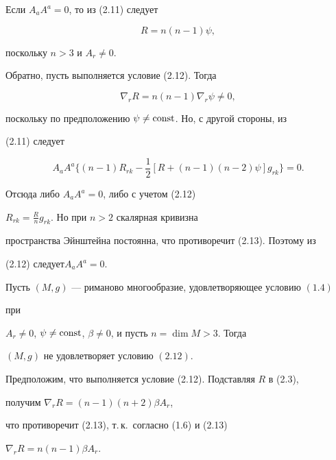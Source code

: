 \begin{pf} 


Если $A_a A^a=0$, то из (2.11) следует 


\begin{equation} 


R=n(n-1)\psi, 


\end{equation} 


поскольку $n>3$ и $A_r\ne 0$. 


 


Обратно, пусть выполняется условие (2.12). Тогда 


\begin{equation} 


\nabla_r R=n(n-1)\nabla_r\psi\ne 0, 


\end{equation} 


поскольку по предположению $\psi\ne\operatorname{const}$. Но, с другой стороны, из 


(2.11) следует 


$$ 


A_a A^a\{(n-1)R_{rk}-\frac{1}{2}[R+(n-1)(n-2)\psi]g_{rk}\}=0. 


$$ 


Отсюда либо $A_a A^a=0$, либо с учетом (2.12)\; 


$R_{rk}=\frac{R}{n}g_{rk}$. Но при $n>2$ скалярная кривизна 


пространства Эйнштейна постоянна, что противоречит (2.13). Поэтому из 


(2.12) следует\linebreak $A_a A^a=0$. 


\end{pf} 


 


\begin{lems} 


Пусть $(M,g)$ --- риманово многообразие, удовлетворяющее условию $(1.4)$ 


при 


$A_r\ne 0$, $\psi\ne\operatorname{const}$, $\beta\ne 0$, и пусть $n=\dim M>3$. Тогда 


$(M,g)$ не удовлетворяет условию $(2.12)$. 


\end{lems} 


 


\begin{pf} 


Предположим, что выполняется условие (2.12). Подставляя $R$ в (2.3), 


получим $\nabla_r R=(n-1)(n+2)\beta A_r$, 


что противоречит (2.13), т.\,к.~согласно (1.6) и (2.13)\; 


$\nabla_r R=n(n-1)\beta A_r$. 


\end{pf} 


